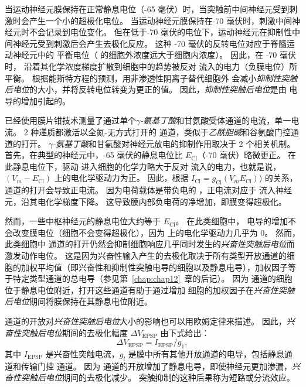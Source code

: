当运动神经元膜保持在正常静息电位（-65 毫伏）时，当突触前中间神经元受到刺激时会产生一个小的超极化电位。
当运动神经元膜保持在-70 毫伏时，刺激中间神经元时不会记录到电位变化。
但在低于-70 毫伏的电位下，运动神经元在抑制性中间神经元受到刺激后会产生去极化反应。
这种 -70 毫伏的反转电位对应于脊髓运动神经元中的  平衡电位（ 的细胞外浓度远大于细胞内浓度）。
因此，在 -70 毫伏时， 沿着其化学浓度梯度扩散到细胞中的趋势被反对  流入的电力（负膜电位）所平衡。
根据能斯特方程的预测，用非渗透性阴离子替代细胞外  会减小\textit{抑制性突触后电位}的大小，并将反转电位转变为更正的值。
因此，\textit{抑制性突触后电位}是由  电导的增加引起的。


已经使用膜片钳技术测量了通过单个\textit{$\gamma$-氨基丁酸}和甘氨酸受体通道的电流，单一电流。
2 种递质都激活以全氮-无方式打开的  通道，类似于\textit{乙酰胆碱}和谷氨酸门控通道的打开。
\textit{$\gamma$-氨基丁酸}和甘氨酸对神经元放电的抑制作用取决于 2 个相关机制。
首先，在典型的神经元中，-65 毫伏的静息电位比 $E_\text{Cl}$（-70 毫伏）略微更正。
在此静息电位下，驱动  进入细胞的化学力略大于反对  流入的电力，也就是说， $(V_m - E_\text{Cl})$ 上的电化学驱动力为正。
因此，根据 $ I_\text{Cl} = g_\text{Cl} (V_m E_\text{Cl})$) 的关系， 通道的打开会导致正电流。 因为电荷载体是带负电的 ，正电流对应于  流入神经元，沿其电化学梯度下降。
这导致膜内部负电荷的净增加，即膜变得超极化。


然而，一些中枢神经元的静息电位大约等于 $E_\text{Cl}$。
在此类细胞中， 电导的增加不会改变膜电位（细胞不会变得超极化），因为  上的电化学驱动力几乎为 0。
然而，此类细胞中  通道的打开仍然会抑制细胞响应几乎同时发生的\textit{兴奋性突触后电位}而激发动作电位。
这是因为兴奋性输入产生的去极化取决于所有类型开放通道的细胞的加权平均值（即兴奋性和抑制性突触电导的细胞以及静息电导），加权因子等于特定类型通道的总电导（参见第~\ref{chap:chap12}~章的后记）。
因为  通道的细胞位于静息电位附近，打开这些通道有助于通过增加  细胞的加权因子在\textit{兴奋性突触后电位}期间将膜保持在其静息电位附近。


 通道的开放对\textit{兴奋性突触后电位}大小的影响也可以用欧姆定律来描述。
因此，\textit{兴奋性突触后电位}期间的去极化幅度 $ \Delta V_{\text{EPSP}} $ 由下式给出：
\begin{equation}\label{depolarization_amplitude}
	\Delta V_{\text{EPSP}} = I_{\text{EPSP}} / g_1,
\end{equation}
其中 $ I_{\text{EPSP}} $ 是兴奋性突触电流，$ g_l $ 是膜中所有其他开放通道的电导，包括静息通道和传输门控  通道。
因为  通道的开放增加了静息电导，即使神经元更加渗漏，\textit{兴奋性突触后电位}期间的去极化减少。
突触抑制的这种后果称为短路或分流效应。


